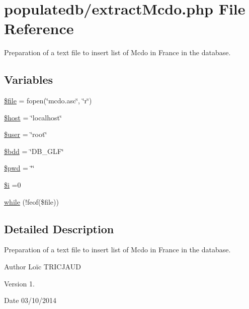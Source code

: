 \hypertarget{extract_mcdo_8php}{\section{populatedb/extract\-Mcdo.php File Reference}
\label{extract_mcdo_8php}
}


Preparation of a text file to insert list of Mcdo in France in the database.  


\subsection*{Variables}
\begin{DoxyCompactItemize}
\item 
\hyperlink{extract_mcdo_8php_aa1bfbd27060176201b271918dff57e8f}{\$file} = fopen(\char`\"{}mcdo.\-asc\char`\"{}, \char`\"{}r\char`\"{})
\item 
\hyperlink{extract_mcdo_8php_a711797613cb863ca0756df789c396bf2}{\$host} = \char`\"{}localhost\char`\"{}
\item 
\hyperlink{extract_mcdo_8php_a598ca4e71b15a1313ec95f0df1027ca5}{\$user} = \char`\"{}root\char`\"{}
\item 
\hyperlink{extract_mcdo_8php_a94f91e878bce0991e2cd595c5dd79b3f}{\$bdd} = \char`\"{}D\-B\-\_\-\-G\-L\-F\char`\"{}
\item 
\hyperlink{extract_mcdo_8php_a12e4252e778952d356721bc655cff8c8}{\$pwd} = \char`\"{}\char`\"{}
\item 
\hyperlink{extract_mcdo_8php_a83018d9153d17d91fbcf3bc10158d34f}{\$i} =0
\item 
\hyperlink{extract_mcdo_8php_a4eebe21070c3a655a77e55ea3fe137f5}{while} (!feof(\$file))
\end{DoxyCompactItemize}


\subsection{Detailed Description}
Preparation of a text file to insert list of Mcdo in France in the database. \begin{DoxyAuthor}{Author}
Loïc T\-R\-I\-C\-J\-A\-U\-D 
\end{DoxyAuthor}
\begin{DoxyVersion}{Version}
1. 
\end{DoxyVersion}
\begin{DoxyDate}{Date}
03/10/2014 
\end{DoxyDate}


